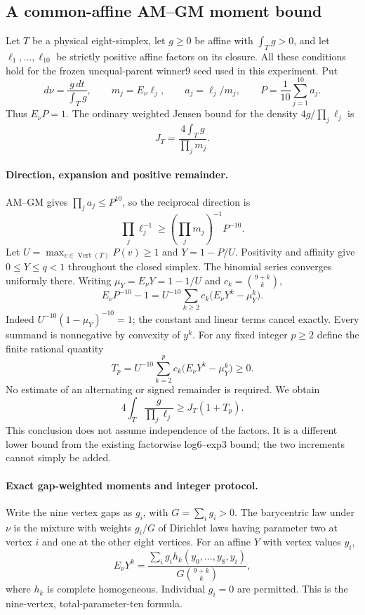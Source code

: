 \subsection{A common-affine AM--GM moment bound}
\label{sec:eighth-joint-affine-moment-pilot-20261009}

Let $T$ be a physical eight-simplex, let $g\ge0$ be affine with
$\int_Tg>0$, and let $\ell_1,\ldots,\ell_{10}$ be strictly positive
affine factors on its closure. All these conditions hold for the
frozen unequal-parent winner9 seed used in this experiment. Put
\[
 d\nu=\frac{g\,dt}{\int_Tg},\qquad
 m_j=E_\nu\ell_j,\qquad a_j=\ell_j/m_j,
 \qquad P=\frac1{10}\sum_{j=1}^{10}a_j.
\]
Thus $E_\nu P=1$. The ordinary weighted Jensen bound for the density
$4g/\prod_j\ell_j$ is
\[
 J_T=\frac{4\int_Tg}{\prod_jm_j}.
\]

\paragraph{Direction, expansion and positive remainder.}
AM--GM gives $\prod_ja_j\le P^{10}$, so the reciprocal direction is
\[
 \prod_j\ell_j^{-1}\ge(\prod_jm_j)^{-1}P^{-10}.
\]
Let $U=\max_{v\in\operatorname{Vert}(T)}P(v)\ge1$ and
$Y=1-P/U$. Positivity and affinity give $0\le Y\le q<1$ throughout
the closed simplex. The binomial series converges uniformly there.
Writing $\mu_Y=E_\nu Y=1-1/U$ and $c_k=\binom{9+k}{k}$,
\[
 E_\nu P^{-10}-1
 =U^{-10}\sum_{k\ge2}c_k
       \bigl(E_\nu Y^k-\mu_Y^k\bigr).
 \tag{1}
\]
Indeed $U^{-10}(1-\mu_Y)^{-10}=1$; the constant and linear terms
cancel exactly. Every summand is nonnegative by convexity of $y^k$.
For any fixed integer $p\ge2$ define the finite rational quantity
\[
 T_p=U^{-10}\sum_{k=2}^pc_k
       \bigl(E_\nu Y^k-\mu_Y^k\bigr)\ge0.
 \tag{2}
\]
No estimate of an alternating or signed remainder is required. We obtain
\[
 4\int_T\frac{g}{\prod_j\ell_j}\ge J_T(1+T_p).
 \tag{3}
\]
This conclusion does not assume independence of the factors. It is a
different lower bound from the existing factorwise log6--exp3 bound;
the two increments cannot simply be added.

\paragraph{Exact gap-weighted moments and integer protocol.}
Write the nine vertex gaps as $g_i$, with $G=\sum_i g_i>0$.
The barycentric law under $\nu$ is the mixture with weights $g_i/G$
of Dirichlet laws having parameter two at vertex $i$ and one at the
other eight vertices. For an affine $Y$ with vertex values $y_i$,
\[
 E_\nu Y^k=
 \frac{\sum_i g_i h_k(y_0,\ldots,y_8,y_i)}
      {G\binom{9+k}{k}},
 \tag{4}
\]
where $h_k$ is complete homogeneous. Individual $g_i=0$ are permitted.
This is the nine-vertex, total-parameter-ten formula.

